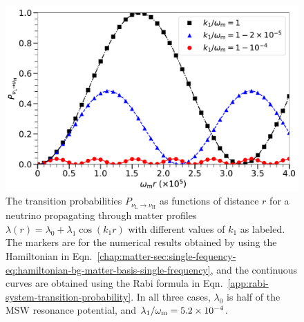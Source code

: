 \begin{figure}[h!tbp]
                \includegraphics[width=\columnwidth]{chapters/assets/rabi/rabiOscillationsNeutrinoCoincidence-single-frequency}
                \caption{The transition probabilities $P_{\nu_\mathrm{L}\to\nu_\mathrm{H}}$ as functions of distance $r$ for a neutrino propagating through matter profiles $\lambda(r)=\lambda_0 + \lambda_1 \cos (k_1 r)$ with different values of $k_1$ as labeled. The markers are for the numerical results obtained by using the Hamiltonian in Eqn.~\ref{chap:matter-sec:single-fequency-eq:hamiltonian-bg-matter-basis-single-frequency}, and the continuous curves are obtained using the Rabi formula in Eqn.~\ref{app:rabi-system-transition-probability}. In all three cases, $\lambda_0$ is half of the MSW resonance potential, and $\lambda_1/\omega_\mathrm m=5.2\times 10^{-4}$.}
                \label{fig-rabiOscillationsNeutrinoCoincidence}
\end{figure}


